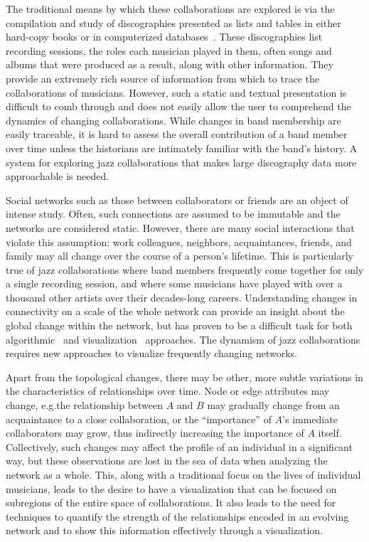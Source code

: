 \documentclass[12pt]{cmuthesis}
\begin{document}
  The traditional means by which these collaborations are explored is via the
  compilation and study of discographies presented as lists and tables in either
  hard-copy books or in computerized databases~\cite{Timner2007,Albin}. These
  discographies list recording sessions, the roles each musician played in them,
  often songs and albums that were produced as a result, along with other
  information. They provide an extremely rich source of information from which to
  trace the collaborations of musicians. However, such a static and textual
  presentation is difficult to comb through and does not easily allow the user
  to comprehend the dynamics of changing collaborations.
  While changes in band membership are easily traceable, it is hard to assess the
  overall contribution of a band member over time unless the historians are
  intimately familiar with the band's history.
  A system for exploring
  jazz collaborations that makes large discography data more approachable
  is needed.

  Social networks such as those between collaborators or friends are an object of
  intense study. Often, such connections are assumed to be immutable and the
  networks are considered static. However, there are many social interactions
  that violate this assumption: work colleagues, neighbors, acquaintances,
  friends, and family may all change over the course of a person's lifetime. This
  is particularly true of jazz collaborations where band members frequently come
  together for only a single recording session, and where some musicians have
  played with over a thousand other artists over their decades-long careers.
  Understanding changes in connectivity on a scale of the whole network can provide
  an insight about the global change within the network, but has proven to be a
  difficult task for both algorithmic~\cite{Hopcroft2004, Palla2005c,
  Tantipathananandh2007, TangLiuZhna08} and visualization~\cite{BenderDeMoll2006,
  Rosvall2010,Yi2010} approaches.  The dynamism of jazz collaborations requires
  new approaches to visualize frequently changing networks.

  Apart from the topological changes, there may be other, more subtle variations
  in the characteristics of relationships over time.  Node or edge attributes may
  change, e.g.\@ the relationship between $A$ and $B$ may gradually change from
  an acquaintance to a close collaboration, or the ``importance'' of $A$'s
  immediate collaborators may grow, thus indirectly increasing the importance of
  $A$ itself.  Collectively, such changes may affect the profile of an individual
  in a significant way, but these observations are lost in the sea of data when
  analyzing the network as a whole. This, along with a traditional focus on the
  lives of individual musicians, leads to the desire to have a visualization that
  can be focused on subregions of the entire space of collaborations. It also
  leads to the need for techniques to quantify the strength of the relationships
  encoded in an evolving network and to show this information effectively through
  a visualization.
\end{document}
